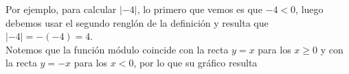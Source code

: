 \documentclass[Análisis.root.tex]{subfiles}
\begin{document}
        Por ejemplo, para calcular \(|−4|\), lo primero que vemos es que \(−4 < 0\), luego debemos usar el segundo renglón de la definición y resulta que \(|−4|=−(−4)=4\).\\
        Notemos que la función módulo coincide con la recta \(y=x\) para los \(x\geq 0\) y con la recta \(y=−x\) para los \(x<0\), por lo que su gráfico resulta
        \begin{center}
        \end{center}
\end{document}

